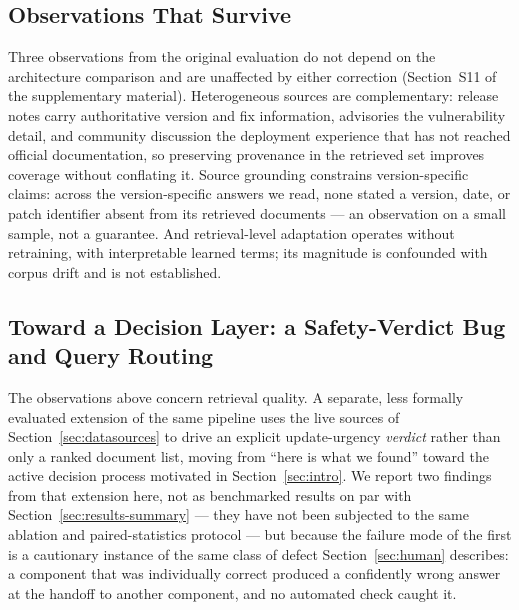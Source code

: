 \documentclass[acmsmall,review,anonymous,screen]{acmart}
\begin{document}
\subsection{Observations That Survive}\label{sec:survives}

Three observations from the original evaluation do not depend on the
architecture comparison and are unaffected by either correction
(Section~S11 of the supplementary material). Heterogeneous sources are complementary:
release notes carry authoritative version and fix information, advisories the
vulnerability detail, and community discussion the deployment experience that
has not reached official documentation, so preserving provenance in the
retrieved set improves coverage without conflating it. Source grounding
constrains version-specific claims: across the version-specific answers we
read, none stated a version, date, or patch identifier absent from its
retrieved documents --- an observation on a small sample, not a guarantee.
And retrieval-level adaptation operates without retraining, with interpretable
learned terms; its magnitude is confounded with corpus drift and is not
established.

\subsection{Toward a Decision Layer: a Safety-Verdict Bug and Query Routing}\label{sec:decision-layer}

The observations above concern retrieval quality. A separate, less formally
evaluated extension of the same pipeline uses the live sources of
Section~\ref{sec:datasources} to drive an explicit update-urgency
\emph{verdict} rather than only a ranked document list, moving from ``here is
what we found'' toward the active decision process motivated in
Section~\ref{sec:intro}. We report two findings from that extension here, not
as benchmarked results on par with Section~\ref{sec:results-summary} --- they
have not been subjected to the same ablation and paired-statistics protocol
--- but because the failure mode of the first is a cautionary instance of the
same class of defect Section~\ref{sec:human} describes: a component that was
individually correct produced a confidently wrong answer at the handoff to
another component, and no automated check caught it.
\end{document}
